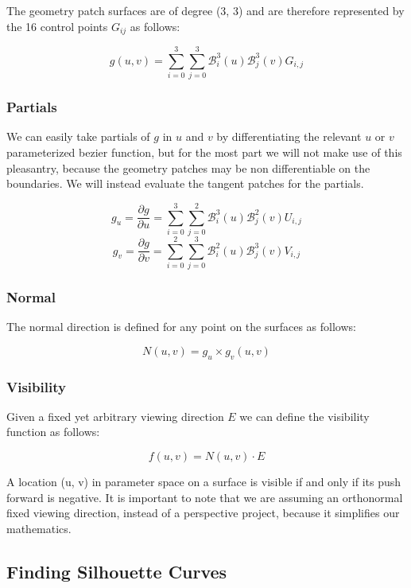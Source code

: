 \documentclass[12pt, letterpaper]{article}
\begin{document}
		The geometry patch surfaces are of degree (3, 3) and are therefore represented by the 16 control points $G_{ij}$ as follows:
		
		$$g(u, v) = \sum_{i=0}^{3}{\sum_{j=0}^{3}{\mathcal{B}_{i}^{3}(u) \mathcal{B}_{j}^{3}(v) G_{i, j}}}$$
		
		\subsubsection{Partials}
		
		We can easily take partials of $g$ in $u$ and $v$ by differentiating the relevant $u$ or $v$ parameterized bezier function, but for the most part we will not make use of this pleasantry, because the geometry patches may be non differentiable on the boundaries. We will instead evaluate the tangent patches for the partials.
		
		$$g_{u} = \frac{\partial g}{\partial u} = \sum_{i=0}^{3}{\sum_{j=0}^{2}{\mathcal{B}_{i}^{3}(u) \mathcal{B}_{j}^{2}(v) U_{i, j}}}$$
		$$g_{v} = \frac{\partial g}{\partial v} = \sum_{i=0}^{2}{\sum_{j=0}^{3}{\mathcal{B}_{i}^{2}(u) \mathcal{B}_{j}^{3}(v) V_{i, j}}}$$
		
		\subsubsection{Normal}
		
		The normal direction is defined for any point on the surfaces as follows:
		
		$$N(u,v) = g_{u} \times g_{v} (u, v)$$
		
		\subsubsection{Visibility}
		
		Given a fixed yet arbitrary viewing direction $E$ we can define the visibility function as follows:
		
		$$f(u, v) = N(u, v) \cdot E$$
		
		A location (u, v) in parameter space on a surface is visible if and only if its push forward is negative. It is important to note that we are assuming an orthonormal fixed viewing direction, instead of a perspective project, because it simplifies our mathematics.
	
	\subsection{Finding Silhouette Curves}
	
\end{document}
